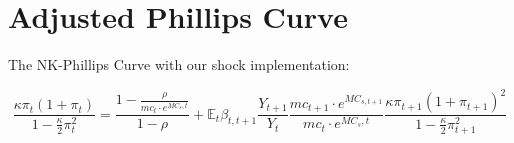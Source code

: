 \documentclass[12pt]{article}
\begin{document}
\section{Adjusted Phillips Curve}\label{app:phillips}

The NK-Phillips Curve with our shock implementation:

\begin{equation}\label{eq:phillips_curve}
    \frac{\kappa \pi_t (1 + \pi_t)}{1 - \frac{\kappa}{2} \pi_t^2}
    = \frac{1 - \frac{\rho}{mc_t \cdot e^{MC_s,t}}}{1 - \rho}
    + \mathbb{E}_t \beta_{t,t+1}
    \frac{Y_{t+1}}{Y_t}
    \frac{mc_{t+1} \cdot e^{MC_{s,t+1}}}{mc_t \cdot e^{MC_s,t}}
    \frac{\kappa \pi_{t+1} (1 + \pi_{t+1})^{2}}{1 - \frac{\kappa}{2} \pi_{t+1}^2}
\end{equation}
\end{document}
